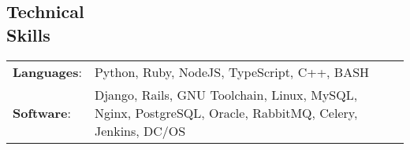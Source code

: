 \documentclass[margin]{res}
\begin{document}
\begin{resume}
    \section{Technical \\ Skills}
      \begin{tabular}{l p{3.6in}}
        \textbf{Languages}:                   & Python, Ruby, NodeJS, TypeScript, C++, BASH \\ [1pt]
        \textbf{Software}:                    & Django, Rails, GNU Toolchain, Linux, MySQL, Nginx, PostgreSQL, Oracle, RabbitMQ, Celery, Jenkins, DC/OS \\ [1pt]
      \end{tabular}

  \end{resume}
\end{document}

